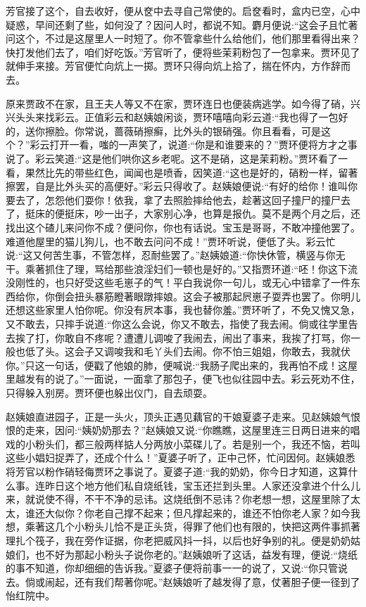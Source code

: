\begin{parag}
    芳官接了这个，自去收好，便从奁中去寻自己常使的。启奁看时，盒内已空，心中疑惑，早间还剩了些，如何没了？因问人时，都说不知。麝月便说:“这会子且忙著问这个，不过是这屋里人一时短了。你不管拿些什么给他们，他们那里看得出来？快打发他们去了，咱们好吃饭。”芳官听了，便将些茉莉粉包了一包拿来。贾环见了就伸手来接。芳官便忙向炕上一掷。贾环只得向炕上拾了，揣在怀内，方作辞而去。
\end{parag}


\begin{parag}
    原来贾政不在家，且王夫人等又不在家，贾环连日也便装病逃学。如今得了硝，兴兴头头来找彩云。正值彩云和赵姨娘闲谈，贾环嘻嘻向彩云道:“我也得了一包好的，送你擦脸。你常说，蔷薇硝擦癣，比外头的银硝强。你且看看，可是这个？”彩云打开一看，嗤的一声笑了，说道:“你是和谁要来的？”贾环便将方才之事说了。彩云笑道:“这是他们哄你这乡老呢。这不是硝，这是茉莉粉。”贾环看了一看，果然比先的带些红色，闻闻也是喷香，因笑道:“这也是好的，硝粉一样，留著擦罢，自是比外头买的高便好。”彩云只得收了。赵姨娘便说:“有好的给你！谁叫你要去了，怎怨他们耍你！依我，拿了去照脸摔给他去，趁著这回子撞尸的撞尸去了，挺床的便挺床，吵一出子，大家别心净，也算是报仇。莫不是两个月之后，还找出这个碴儿来问你不成？便问你，你也有话说。宝玉是哥哥，不敢冲撞他罢了。难道他屋里的猫儿狗儿，也不敢去问问不成！”贾环听说，便低了头。彩云忙说:“这又何苦生事，不管怎样，忍耐些罢了。”赵姨娘道:“你快休管，横竖与你无干。乘著抓住了理，骂给那些浪淫妇们一顿也是好的。”又指贾环道:“呸！你这下流没刚性的，也只好受这些毛崽子的气！平白我说你一句儿，或无心中错拿了一件东西给你，你倒会扭头暴筋瞪著眼蹾摔娘。这会子被那起屄崽子耍弄也罢了。你明儿还想这些家里人怕你呢。你没有屄本事，我也替你羞。”贾环听了，不免又愧又急，又不敢去，只摔手说道:“你这么会说，你又不敢去，指使了我去闹。倘或往学里告去挨了打，你敢自不疼呢？遭遭儿调唆了我闹去，闹出了事来，我挨了打骂，你一般也低了头。这会子又调唆我和毛丫头们去闹。你不怕三姐姐，你敢去，我就伏你。”只这一句话，便戳了他娘的肺，便喊说:“我肠子爬出来的，我再怕不成！这屋里越发有的说了。”一面说，一面拿了那包子，便飞也似往园中去。彩云死劝不住，只得躲入别房。贾环便也躲出仪门，自去顽耍。
\end{parag}


\begin{parag}
    赵姨娘直进园子，正是一头火，顶头正遇见藕官的干娘夏婆子走来。见赵姨娘气恨恨的走来，因问:“姨奶奶那去？”赵姨娘又说:“你瞧瞧，这屋里连三日两日进来的唱戏的小粉头们，都三般两样掂人分两放小菜碟儿了。若是别一个，我还不恼，若叫这些小娼妇捉弄了，还成个什么！”夏婆子听了，正中己怀，忙问因何。赵姨娘悉将芳官以粉作硝轻侮贾环之事说了。夏婆子道:“我的奶奶，你今日才知道，这算什么事。连昨日这个地方他们私自烧纸钱，宝玉还拦到头里。人家还没拿进个什么儿来，就说使不得，不干不净的忌讳。这烧纸倒不忌讳？你老想一想，这屋里除了太太，谁还大似你？你老自己撑不起来；但凡撑起来的，谁还不怕你老人家？如今我想，乘著这几个小粉头儿恰不是正头货，得罪了他们也有限的，快把这两件事抓著理扎个筏子，我在旁作证据，你老把威风抖一抖，以后也好争别的礼。便是奶奶姑娘们，也不好为那起小粉头子说你老的。”赵姨娘听了这话，益发有理，便说:“烧纸的事不知道，你却细细的告诉我。”夏婆子便将前事一一的说了，又说:“你只管说去。倘或闹起，还有我们帮著你呢。”赵姨娘听了越发得了意，仗著胆子便一径到了怡红院中。
\end{parag}


